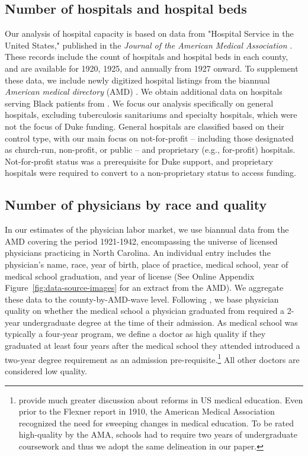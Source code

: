 \documentclass[12pt]{article}
\begin{document}
\subsection{Number of hospitals and hospital beds} \label{subsec:data-hospitals-beds}

Our analysis of hospital capacity is based on data from "Hospital Service in the United States," published in the \textit{Journal of the American Medical Association} . These records include the count of hospitals and hospital beds in each county, and are available for 1920, 1925, and annually from 1927 onward. To supplement these data, we include newly digitized hospital listings from the biannual \textit{American medical directory} (AMD) . We obtain additional data on hospitals serving Black patients from . 
We focus our analysis specifically on general hospitals, excluding tuberculosis sanitariums and specialty hospitals, which were not the focus of Duke funding. 
General hospitals are classified based on their control type, with our main focus on not-for-profit  -- including those designated as church-run, non-profit, or public -- and proprietary (e.g., for-profit) hospitals. 
Not-for-profit status was a prerequisite for Duke support, and proprietary hospitals were required to convert to a non-proprietary status to access funding. 


\subsection{Number of physicians by race and quality}\label{subsec:data-physician-race-quality}

In our estimates of the physician labor market, we use biannual data from the AMD covering the period 1921-1942, encompassing the universe of licensed physicians practicing in North Carolina. 
An individual entry includes the physician's name, race, year of birth, place of practice, medical school, year of medical school graduation, and year of license (See Online Appendix Figure~\ref{fig:data-source-images} for an extract from the AMD). 
We aggregate these data to the county-by-AMD-wave level. 
Following , we base physician quality on whether the medical school a physician graduated from required a 2-year undergraduate degree at the time of their admission. 
As medical school was typically a four-year program, we define a doctor as high quality if they graduated at least four years after the medical school they attended introduced a two-year degree requirement as an admission pre-requisite.\footnote{
 provide much greater discussion about reforms in US medical education. Even prior to the Flexner report in 1910, the American Medical Association recognized the need for sweeping changes in medical education. 
To be rated high-quality by the AMA, schools had to require two years of undergraduate coursework and thus we adopt the same delineation in our paper. 
} 
All other doctors are considered low quality. 
\end{document}
